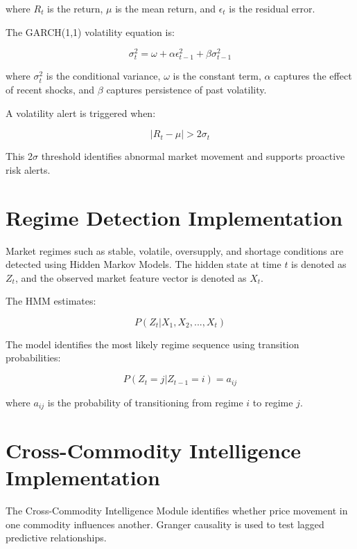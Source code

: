 \documentclass[12pt,a4paper]{report}
\begin{document}
where $R_t$ is the return, $\mu$ is the mean return, and $\epsilon_t$ is the residual error.

The GARCH(1,1) volatility equation is:

\begin{equation}
\sigma_t^2 = \omega + \alpha \epsilon_{t-1}^2 + \beta \sigma_{t-1}^2
\end{equation}

where $\sigma_t^2$ is the conditional variance, $\omega$ is the constant term, $\alpha$ captures the effect of recent shocks, and $\beta$ captures persistence of past volatility.

A volatility alert is triggered when:

\begin{equation}
|R_t - \mu| > 2\sigma_t
\end{equation}

This 2$\sigma$ threshold identifies abnormal market movement and supports proactive risk alerts.

\section{Regime Detection Implementation}

Market regimes such as stable, volatile, oversupply, and shortage conditions are detected using Hidden Markov Models. The hidden state at time $t$ is denoted as $Z_t$, and the observed market feature vector is denoted as $X_t$.

The HMM estimates:

\begin{equation}
P(Z_t | X_1, X_2, ..., X_t)
\end{equation}

The model identifies the most likely regime sequence using transition probabilities:

\begin{equation}
P(Z_t = j | Z_{t-1} = i) = a_{ij}
\end{equation}

where $a_{ij}$ is the probability of transitioning from regime $i$ to regime $j$.

\section{Cross-Commodity Intelligence Implementation}

The Cross-Commodity Intelligence Module identifies whether price movement in one commodity influences another. Granger causality is used to test lagged predictive relationships.
\end{document}
